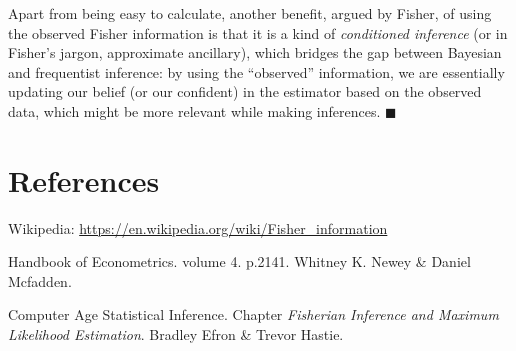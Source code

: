 \documentclass[11pt]{article}
\begin{document}
Apart from being easy to calculate,
another benefit, argued by Fisher, of using the observed Fisher information 
is that it is a kind of \emph{conditioned inference}
(or in Fisher's jargon, approximate ancillary),
which bridges the gap between Bayesian and frequentist inference:
by using the ``observed'' information,
we are essentially updating our belief (or our confident) in the estimator based on the observed data,
which might be more relevant while making inferences.
\hfill$\blacksquare$

\vfill

\section*{References}

\begin{enumerate}[label = {[\arabic*]}]
	\item Wikipedia: \url{https://en.wikipedia.org/wiki/Fisher_information}
	\item Handbook of Econometrics. volume 4. p.2141. Whitney K. Newey \& Daniel Mcfadden.  
	\item Computer Age Statistical Inference. Chapter \emph{Fisherian Inference and Maximum Likelihood Estimation}. Bradley Efron \& Trevor Hastie.
\end{enumerate}
\end{document}
